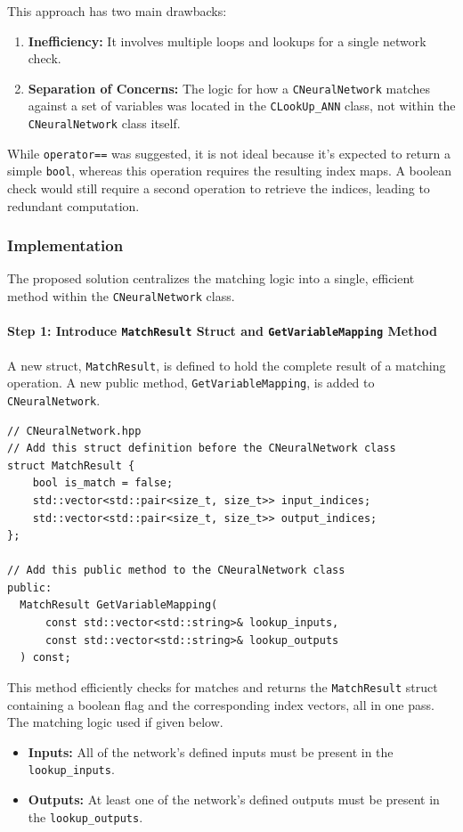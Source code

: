 \documentclass{article}
\begin{document}
This approach has two main drawbacks:
\begin{enumerate}
    \item \textbf{Inefficiency:} It involves multiple loops and lookups for a single network check.
    \item \textbf{Separation of Concerns:} The logic for how a \texttt{CNeuralNetwork} matches against a set of variables was located in the \texttt{CLookUp\_ANN} class, not within the \texttt{CNeuralNetwork} class itself.
\end{enumerate}

While \texttt{operator==} was suggested, it is not ideal because it's expected to return a simple \texttt{bool}, whereas this operation requires the resulting index maps. A boolean check would still require a second operation to retrieve the indices, leading to redundant computation.

\subsubsection{Implementation}

The proposed solution centralizes the matching logic into a single, efficient method within the \texttt{CNeuralNetwork} class.

\paragraph{Step 1: Introduce \texttt{MatchResult} Struct and \texttt{GetVariableMapping} Method}

A new struct, \texttt{MatchResult}, is defined to hold the complete result of a matching operation. A new public method, \texttt{GetVariableMapping}, is added to \texttt{CNeuralNetwork}.

\begin{verbatim}
// CNeuralNetwork.hpp
// Add this struct definition before the CNeuralNetwork class
struct MatchResult {
    bool is_match = false;
    std::vector<std::pair<size_t, size_t>> input_indices;
    std::vector<std::pair<size_t, size_t>> output_indices;
};

// Add this public method to the CNeuralNetwork class
public:
  MatchResult GetVariableMapping(
      const std::vector<std::string>& lookup_inputs,
      const std::vector<std::string>& lookup_outputs
  ) const;
\end{verbatim}

This method efficiently checks for matches and returns the \texttt{MatchResult} struct containing a boolean flag and the corresponding index vectors, all in one pass. The matching logic used if given below. 
\begin{itemize}
    \item \textbf{Inputs:} All of the network's defined inputs must be present in the \texttt{lookup\_inputs}.
    \item \textbf{Outputs:} At least one of the network's defined outputs must be present in the \texttt{lookup\_outputs}.
\end{itemize}
\end{document}
